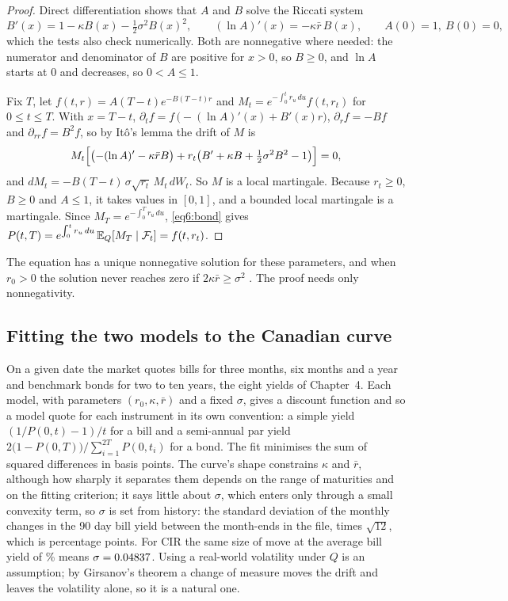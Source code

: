 \begin{chapterrefs}
\begin{proof}
Direct differentiation shows that $A$ and $B$ solve the Riccati system
\[
  B'(x)=1-\kappa B(x)-\tfrac12\sigma^2B(x)^2,\qquad (\ln A)'(x)=-\kappa\bar r\,B(x),\qquad A(0)=1,\ B(0)=0,
\]
which the tests also check numerically. Both are nonnegative where needed: the numerator and denominator
of $B$ are positive for $x>0$, so $B\ge0$, and $\ln A$ starts at 0 and decreases, so $0<A\le1$.

Fix $T$, let $f(t,r)=A(T-t)e^{-B(T-t)r}$ and $M_t=e^{-\int_0^tr_u\,du}f(t,r_t)$ for $0\le t\le T$. With
$x=T-t$, $\partial_tf=f\,\bigl(-(\ln A)'(x)+B'(x)r\bigr)$, $\partial_rf=-Bf$ and $\partial_{rr}f=B^2f$, so
by It\^o's lemma the drift of $M$ is
\[
  M_t\Bigl[\bigl(-(\ln A)'-\kappa\bar rB\bigr)+r_t\bigl(B'+\kappa B+\tfrac12\sigma^2B^2-1\bigr)\Bigr]=0 ,
\]
and $dM_t=-B(T-t)\,\sigma\sqrt{r_t}\,M_t\,dW_t$. So $M$ is a local martingale. Because $r_t\ge0$, $B\ge0$ and
$A\le1$, it takes values in $[0,1]$, and a bounded local martingale is a martingale. Since
$M_T=e^{-\int_0^Tr_u\,du}$, \cref{eq6:bond} gives $P(t,T)=e^{\int_0^tr_u\,du}\,\mathbb{E}_Q[M_T\mid\mathcal F_t]=f(t,r_t)$.
\end{proof}

The equation has a unique nonnegative solution for these parameters, and when $r_0>0$ the solution
never reaches zero if $2\kappa\bar r\ge\sigma^2$ \parencite{feller1951,cox1985}. The proof needs only nonnegativity.

\subsection{Fitting the two models to the Canadian curve}

On a given date the market quotes bills for three months, six months and a year and benchmark bonds
for two to ten years, the eight yields of Chapter~4. Each model, with parameters
$(r_0,\kappa,\bar r)$ and a fixed $\sigma$, gives a discount function and so a model quote for each
instrument in its own convention: a simple yield $(1/P(0,t)-1)/t$ for a bill and a semi-annual par
yield $2\bigl(1-P(0,T)\bigr)/\sum_{i=1}^{2T}P(0,t_i)$ for a bond. The fit minimises the sum of squared
differences in basis points. The curve's shape constrains $\kappa$ and $\bar r$, although how sharply it separates them depends on
the range of maturities and on the fitting criterion; it says little about $\sigma$, which enters only through a small convexity term, so $\sigma$ is set from history:
the standard deviation of the monthly changes in the 90 day bill yield between the \srVolN{} month-ends
in the file, times $\sqrt{12}$, which is \srSigV{} percentage points. For CIR the same size of move at the
average bill yield of \srMeanBill\% means $\sigma=0.04837$. Using a real-world volatility under $Q$ is
an assumption; by Girsanov's theorem a change of measure moves the drift and leaves the volatility
alone, so it is a natural one.


\end{chapterrefs}
